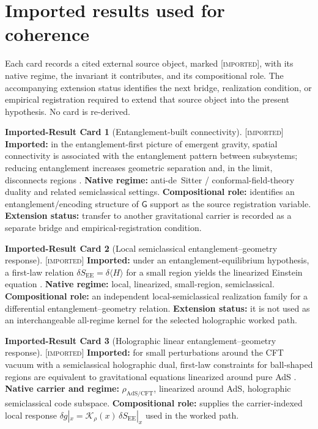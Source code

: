 \documentclass[11pt]{article}
\newcommand{\SEE}{\ensuremath{S_{\mathrm{EE}}}}
\newcommand{\Imp}{\textsc{[imported]}}
\theoremstyle{definition}
\newtheorem{scard}{Imported-Result Card}
\begin{document}
\section{Imported results used for coherence}
\label{supp:imported}

Each card records a cited external source object, marked \Imp{}, with its native
regime, the invariant it contributes, and its compositional role. The accompanying
extension status identifies the next bridge, realization condition, or empirical
registration required to extend that source object into the present hypothesis. No
card is re-derived.


\begin{scard}[Entanglement-built connectivity]\label{card:vr}
\Imp{} \textbf{Imported:} in the entanglement-first picture of emergent gravity,
spatial connectivity is associated with the entanglement pattern between
subsystems; reducing entanglement increases geometric separation and, in the limit,
disconnects regions \cite{S_VanRaamsdonk2010, S_MaldacenaSusskind2013}.
\textbf{Native regime:} anti-de~Sitter / conformal-field-theory duality and related
semiclassical settings. \textbf{Compositional role:} identifies an
entanglement/encoding structure of $\mathsf{G}$ support as the source registration
variable. \textbf{Extension status:} transfer to another gravitational carrier is
recorded as a separate bridge and empirical-registration condition.
\end{scard}

\begin{scard}[Local semiclassical entanglement--geometry response]
\label{card:jacobson}
\Imp{} \textbf{Imported:} under an entanglement-equilibrium hypothesis, a first-law
relation $\delta\SEE=\delta\langle H\rangle$ for a small region yields the linearized
Einstein equation \cite{S_Jacobson2016}. \textbf{Native regime:} local,
linearized, small-region, semiclassical. \textbf{Compositional role:} an
independent local-semiclassical realization family for a differential
entanglement--geometry relation. \textbf{Extension status:} it is not used as an
interchangeable all-regime kernel for the selected holographic worked path.
\end{scard}

\begin{scard}[Holographic linear entanglement--geometry response]
\label{card:faulkner-linear}
\Imp{} \textbf{Imported:} for small perturbations around the CFT vacuum with a
semiclassical holographic dual, first-law constraints for ball-shaped regions are
equivalent to gravitational equations linearized around pure AdS
\cite{S_FaulknerEtAl2014}. \textbf{Native carrier and regime:}
$\rho_{\mathrm{AdS/CFT}}$, linearized around AdS, holographic semiclassical code
subspace. \textbf{Compositional role:} supplies the carrier-indexed local response
$\delta g|_x=\mathcal K_{\rho}(x)\,\delta\SEE|_x$ used in the worked path.
\end{scard}
\end{document}
